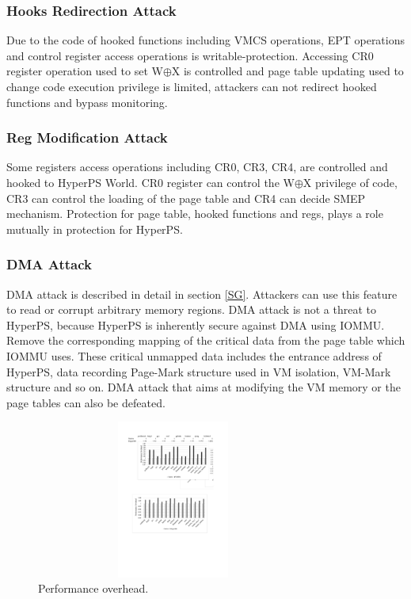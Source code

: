 \documentclass[conference]{IEEEtran}
\begin{document}
\subsubsection{Hooks Redirection Attack}

Due to the code of hooked functions including VMCS operations, EPT operations and control register access operations is writable-protection. Accessing CR0 register operation used to set W$\oplus${X} is controlled and page table updating used to change code execution privilege is limited, attackers can not redirect hooked functions and bypass monitoring.

\subsubsection{Reg Modification Attack}

Some registers access operations including CR0, CR3, CR4, are controlled and hooked to HyperPS World. CR0 register can control the W$\oplus${X} privilege of code, CR3 can control the loading of the page table and CR4 can decide SMEP mechanism. Protection for page table, hooked functions and regs, plays a role mutually in protection for HyperPS. 

\subsubsection{DMA Attack}

 DMA attack is described in detail in section \ref{SG}. Attackers can use this feature to read or corrupt arbitrary memory regions. DMA attack is not a threat to HyperPS, because HyperPS is inherently secure against DMA using IOMMU. Remove the corresponding mapping of the critical data from the page table which IOMMU uses. These critical unmapped data includes the entrance address of HyperPS, data recording Page-Mark structure used in VM isolation, VM-Mark structure and so on. DMA attack that aims at modifying the VM memory or the page tables can also be defeated.

\begin{figure}
\centerline{\includegraphics[width=9cm,height=5.2cm]{performance.pdf}}
\caption{Performance overhead.} \label{fig5}
\end{figure}
\end{document}
